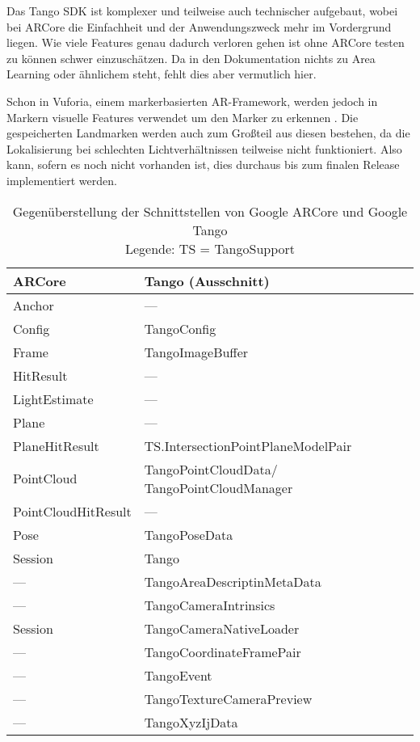 Das Tango SDK ist komplexer und teilweise auch technischer aufgebaut, wobei bei ARCore die Einfachheit und der Anwendungszweck mehr im Vordergrund liegen. Wie viele Features genau dadurch verloren gehen ist ohne ARCore testen zu können schwer einzuschätzen. Da in den Dokumentation nichts zu Area Learning oder ähnlichem steht, fehlt dies aber vermutlich hier.

Schon in Vuforia, einem markerbasierten AR-Framework, werden jedoch in Markern visuelle Features verwendet um den Marker zu erkennen \cite{fehling}. Die gespeicherten Landmarken werden auch zum Großteil aus diesen bestehen, da die Lokalisierung bei schlechten Lichtverhältnissen teilweise nicht funktioniert. Also kann, sofern es noch nicht vorhanden ist, dies durchaus bis zum finalen Release implementiert werden.

\begin{table}[h]
	\centering
	\begin{tabular}{|p{4cm}|p{4cm}|}
		\hline
		\textbf{ARCore} & \textbf{Tango (Ausschnitt)}\\
		\hline
		Anchor & ---\\
		Config & TangoConfig\\
		Frame & TangoImageBuffer\\
		HitResult & ---\\
		LightEstimate & ---\\
		Plane & ---\\
		PlaneHitResult & TS.IntersectionPointPlaneModelPair\\
		PointCloud & TangoPointCloudData/ TangoPointCloudManager\\
		PointCloudHitResult & ---\\
		Pose & TangoPoseData\\
		Session & Tango\\
		--- & TangoAreaDescriptinMetaData\\
		--- & TangoCameraIntrinsics\\
		Session & TangoCameraNativeLoader\\
		--- & TangoCoordinateFramePair\\
		--- & TangoEvent\\
		--- & TangoTextureCameraPreview\\
		--- & TangoXyzIjData\\
		\hline
	\end{tabular}
	\caption{Gegenüberstellung der Schnittstellen von Google ARCore\cite{arcore_android_reference} und Google Tango\cite{tango_android_reference}\\
	Legende: TS = TangoSupport}
	\label{arcore_vs_tango}
\end{table}
